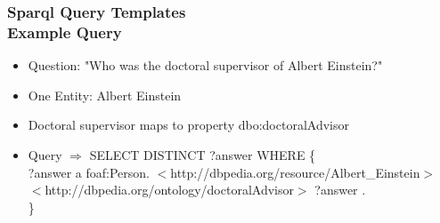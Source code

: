 \documentclass{beamer}
\newcommand\tab[1][1cm]{\hspace*{#1}}
\begin{document}
\begin{frame}
\frametitle{Sparql Query Templates \\ {\normalsize Example Query}}
\begin{example}
	\begin{itemize}
		\item Question: "Who was the doctoral supervisor of Albert Einstein?"
		\item One Entity: Albert Einstein
		\item Doctoral supervisor maps to property dbo:doctoralAdvisor  
		\item[] Query $\Rightarrow$ SELECT DISTINCT ?answer WHERE \{  \\
		\tab[1.4cm]	?answer a foaf:Person. 
		\tab[1.4cm] $<$http://dbpedia.org/resource/Albert\_Einstein$>$ 
		\tab[1.4cm] $<$http://dbpedia.org/ontology/doctoralAdvisor$>$ ?answer . \\
		\tab[1.4cm] \}
	\end{itemize}
\end{example}
\end{frame}
\end{document}
